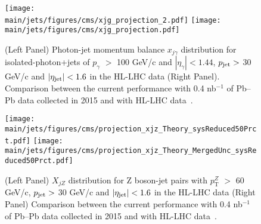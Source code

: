 
\begin{figure}[!ht]
\begin{center}
\texttt{[image: \\main/jets/figures/cms/xjg\_projection\_2.pdf]}
\texttt{[image: \\main/jets/figures/cms/xjg\_projection.pdf]}
\caption{(Left Panel) Photon-jet momentum balance $x_{j\gamma}$ distribution for isolated-photon+jets of $p_{\gamma}$ $> $ 100 GeV/c and $|\eta_{\gamma}|<1.44$, $p_{\rm jet} > $ 30 GeV/c and $|\eta_{\rm jet}| < 1.6$ in the HL-LHC data (Right Panel). Comparison between the current performance with 0.4 nb$^{-1}$ of Pb--Pb data collected in 2015 and with HL-LHC data~\cite{CMS-FTR-17-002:2017dec}.}
\label{fig:photonjet}
\end{center}
\end{figure}
%
\begin{figure}[!ht]
\begin{center}
\texttt{[image: \\main/jets/figures/cms/projection\_xjz\_Theory\_sysReduced50Prct.pdf]}
\texttt{[image: \\main/jets/figures/cms/projection\_xjz\_Theory\_MergedUnc\_sysReduced50Prct.pdf]}
\caption{(Left Panel) $X_{jZ}$ distribution for Z boson-jet pairs with $p_\mathrm{T}^{Z}$ $> $ 60 GeV/c, $p_{\rm jet} > $ 30 GeV/c and $|\eta_{\rm jet}| < 1.6$ in the HL-LHC data (Right Panel) Comparison between the current performance with 0.4 nb$^{-1}$ of Pb--Pb data collected in 2015 and with HL-LHC data~\cite{CMS-FTR-17-002:2017dec}.}
\label{fig:Zjet}
\end{center}
\end{figure}
